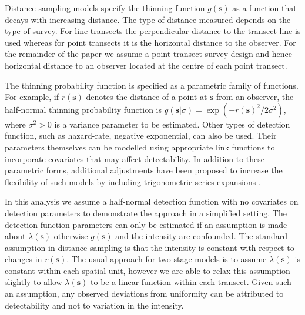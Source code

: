 \documentclass{statsoc}
\newcommand{\bs}{\mathbf{s}}
\begin{document}
Distance sampling models specify the thinning function $g(\bs)$ as a function that decays with increasing distance.  The type of distance measured depends on the type of survey.  For line transects the perpendicular distance to the transect line is used whereas for point transects it is the horizontal distance to the observer.  For the remainder of the paper we assume a point transect survey design and hence horizontal distance to an observer located at the centre of each point transect.  

The thinning probability function is specified as a parametric family of functions. For example, if $r(\bs)$ denotes the distance of a point at $\bs$ from an observer, the half-normal thinning probability function is $g(\bs | \sigma) = \exp(-r(\bs)^2 / 2\sigma^2)$, where $\sigma^2 > 0$ is a variance parameter to be estimated.  Other types of detection function, such as hazard-rate, negative exponential, can also be used. Their parameters themselves can be modelled using appropriate link functions to incorporate covariates that may affect detectability.  In addition to these parametric forms, additional adjustments have been proposed to increase the flexibility of such models by including trigonometric series expansions \citep{buckland_distance_2015}.  

In this analysis we assume a half-normal detection function with no covariates on detection parameters to demonstrate the approach in a simplified setting.  The detection function parameters can only be estimated if an assumption is made about $\lambda(\bs)$ otherwise $g(\bs)$ and the intensity are confounded.  The standard assumption in distance sampling is that the intensity is constant with respect to changes in $r(\bs)$. The usual approach for two stage models is to assume $\lambda(\bs)$ is constant within each spatial unit, however we are able to relax this assumption slightly to allow $\lambda(\bs)$ to be a linear function within each transect.  Given such an assumption, any observed deviations from uniformity can be attributed to detectability and not to variation in the intensity.
\end{document}
